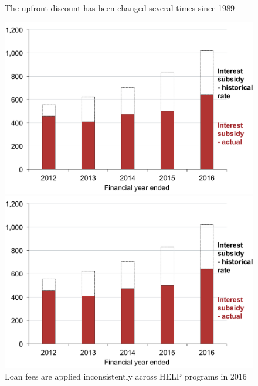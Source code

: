 \documentclass{grattan}
\begin{document}
\begin{figure}
\begin{minipage}[t][\textheight]{\columnwidth}
\vspace{\grattanfptop}
\caption{The upfront discount has been changed several times since 1989}\label{fig:fig18-the-upfront-discount-has-been-changed-several-times-since-1989}

\includegraphics[page=18]{atlas/Chartpack.pdf}

\end{minipage}
\hfill 
\begin{minipage}[t][\textheight]{\columnwidth}
\vspace{\grattanfptop}
\caption[Loan fees are applied inconsistently across HELP programs in 2016]{\Gls{Loan fees} are applied inconsistently across \gls{HELP} programs in 2016}\label{fig:fig19-loan-fees-are-applied-inconsitently-across-HELP-programs-2016}

\includegraphics[page=19]{atlas/Chartpack.pdf}


\end{minipage}
\end{figure}
\end{document}
